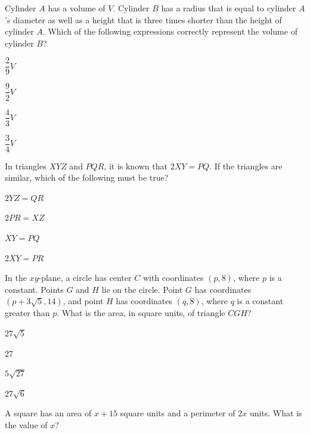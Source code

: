 \vfill
\noindent\begin{minipage}{\linewidth}
\par\smallskip
Cylinder $A$ has a volume of $V$. Cylinder $B$ has a radius that is equal to cylinder $A$'s diameter as well as a height that is three times shorter than the height of cylinder $A$. Which of the following expressions correctly represent the volume of cylinder $B$?
\begin{satchoices}
  \item[A)] $\dfrac{2}{9}V$
  \item[B)] $\dfrac{9}{2}V$
  \item[C)] $\dfrac{4}{3}V$
  \item[D)] $\dfrac{3}{4}V$
\end{satchoices}
\end{minipage}
\vfill
\noindent\begin{minipage}{\linewidth}
\par\smallskip
In triangles $XYZ$ and $PQR$, it is known that $2XY=PQ$. If the triangles are similar, which of the following must be true?
\begin{satchoices}
  \item[A)] $2YZ=QR$
  \item[B)] $2PR=XZ$
  \item[C)] $XY=PQ$
  \item[D)] $2XY=PR$
\end{satchoices}
\end{minipage}
\vfill
\clearpage
\noindent\begin{minipage}{\linewidth}
\par\smallskip
In the $xy$-plane, a circle has center $C$ with coordinates $(p,8)$, where $p$ is a constant. Points $G$ and $H$ lie on the circle. Point $G$ has coordinates $(p+3\sqrt{5},14)$, and point $H$ has coordinates $(q,8)$, where $q$ is a constant greater than $p$. What is the area, in square units, of triangle $CGH$?
\begin{satchoices}
  \item[A)] $27\sqrt{5}$
  \item[B)] $27$
  \item[C)] $5\sqrt{27}$
  \item[D)] $27\sqrt{6}$
\end{satchoices}
\end{minipage}
\vfill
\noindent\begin{minipage}{\linewidth}
\par\smallskip
A square has an area of $x+15$ square units and a perimeter of $2x$ units. What is the value of $x$?
\end{minipage}
